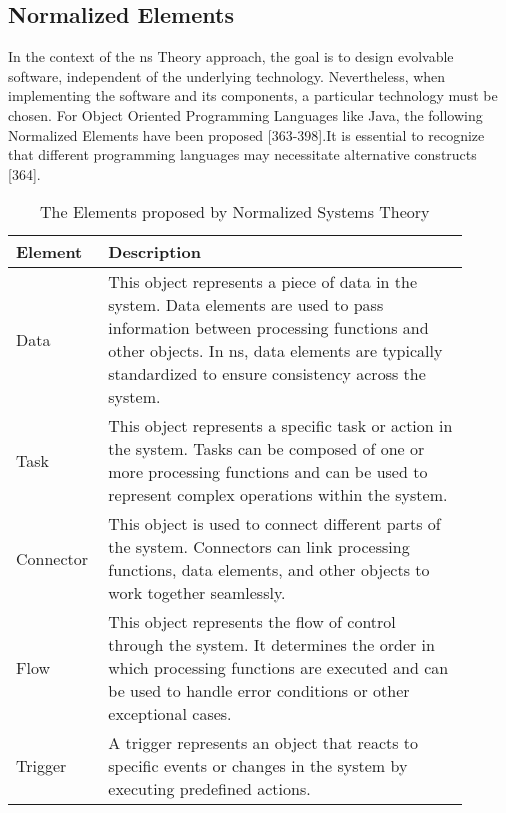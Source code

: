 \subsection{Normalized Elements} \label{subsec_ns_elements} 

In the context of the \gls{ns} Theory approach, the goal is to design evolvable software,
independent of the underlying technology. Nevertheless, when implementing the software and
its components, a particular technology must be chosen. For Object Oriented Programming
Languages like Java, the following Normalized Elements have been proposed
\parencite{mannaert_normalized_2016}[363-398].It is essential to recognize that different
programming languages may necessitate alternative constructs
\parencite{mannaert_normalized_2016}[364].

\begin{table}[H]
    \begin{tabular}{ p{0.15\linewidth} p{0.75\linewidth}}
        \hline
        \textbf{Element} & \textbf{Description} \\ 
        \hline
        Data & This object represents a piece of data in the system. Data elements are
        used to pass information between processing functions and other objects. In
        \gls{ns}, data elements are typically standardized to ensure consistency across
        the system.\\ \midrule

        Task & This object represents a specific task or action in the system. Tasks can
        be composed of one or more processing functions and can be used to represent
        complex operations within the system.\\ \midrule

        Connector & This object is used to connect different parts of the system.
        Connectors can link processing functions, data elements, and other objects to work
        together seamlessly.\\ \midrule

        Flow & This object represents the flow of control through the system.
        It determines the order in which processing functions are executed and can be used
        to handle error conditions or other exceptional cases.\\ \midrule

        Trigger & A trigger represents an object that reacts to specific events or changes in the system
        by executing predefined actions.\\

        \bottomrule
    \end{tabular}
    \caption{The Elements proposed by Normalized Systems Theory}
    \label{ns_element}
\end{table}